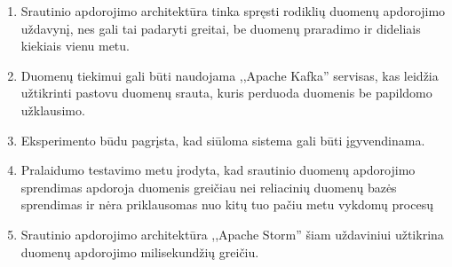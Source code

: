 \documentclass{VUMIFPSkursinis}
\begin{document}
    \begin{enumerate}
    \item Srautinio apdorojimo architektūra tinka spręsti rodiklių duomenų apdorojimo uždavynį, nes gali tai padaryti greitai, be 
    duomenų praradimo ir dideliais kiekiais vienu metu.
    \item Duomenų tiekimui gali būti naudojama ,,Apache Kafka'' servisas, kas leidžia užtikrinti pastovu duomenų srauta, kuris
    perduoda duomenis be papildomo užklausimo.
    \item Eksperimento būdu pagrįsta, kad siūloma sistema gali būti įgyvendinama.
    \item Pralaidumo testavimo metu įrodyta, kad srautinio duomenų apdorojimo sprendimas apdoroja duomenis greičiau nei reliacinių duomenų
    bazės sprendimas ir nėra priklausomas nuo kitų tuo pačiu metu vykdomų procesų
    \item Srautinio apdorojimo architektūra ,,Apache Storm'' šiam uždaviniui užtikrina duomenų apdorojimo milisekundžių greičiu.  

    \end{enumerate}

\printbibliography[heading=bibintoc] 
\end{document}
